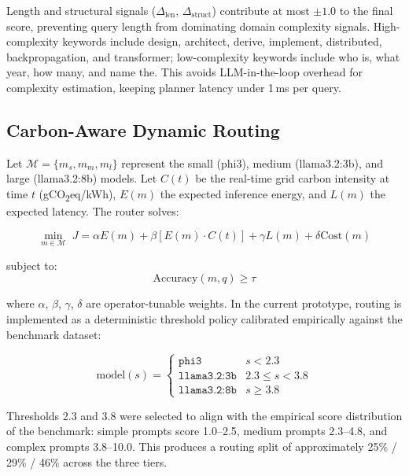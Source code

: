 \documentclass[journal]{IEEEtran}
\begin{document}
Length and structural signals ($\Delta_{\text{len}}$, $\Delta_{\text{struct}}$)
contribute at most $\pm1.0$ to the final score, preventing query length from
dominating domain complexity signals. High-complexity keywords include design,
architect, derive, implement, distributed, backpropagation, and transformer;
low-complexity keywords include who is, what year, how many, and name the.
This avoids LLM-in-the-loop overhead for complexity estimation, keeping
planner latency under 1\,ms per query.

\subsection{Carbon-Aware Dynamic Routing}

Let $\mathcal{M} = \{m_s, m_m, m_l\}$ represent the small (phi3), medium
(llama3.2:3b), and large (llama3.2:8b) models. Let $C(t)$ be the real-time
grid carbon intensity at time $t$ (gCO\textsubscript{2}eq/kWh), $E(m)$ the
expected inference energy, and $L(m)$ the expected latency. The router solves:

\begin{equation}
    \min_{m \in \mathcal{M}} \; J = \alpha E(m) + \beta [E(m) \cdot C(t)] + \gamma L(m) + \delta \text{Cost}(m)
    \label{eq:objective}
\end{equation}

subject to:
\begin{equation}
    \text{Accuracy}(m, q) \geq \tau
    \label{eq:constraint}
\end{equation}

where $\alpha$, $\beta$, $\gamma$, $\delta$ are operator-tunable weights. In
the current prototype, routing is implemented as a deterministic threshold
policy calibrated empirically against the benchmark dataset:

\begin{equation}
    \text{model}(s) =
    \begin{cases}
        \texttt{phi3}         & s < 2.3 \\
        \texttt{llama3.2:3b}  & 2.3 \leq s < 3.8 \\
        \texttt{llama3.2:8b}  & s \geq 3.8
    \end{cases}
    \label{eq:routing}
\end{equation}

Thresholds 2.3 and 3.8 were selected to align with the empirical score
distribution of the benchmark: simple prompts score 1.0--2.5, medium prompts
2.3--4.8, and complex prompts 3.8--10.0. This produces a routing split of
approximately 25\% / 29\% / 46\% across the three tiers.
\end{document}
